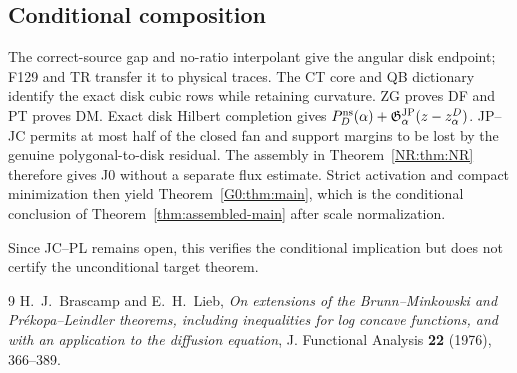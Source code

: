 \documentclass[11pt]{amsart}
\numberwithin{equation}{section}
\theoremstyle{definition}
\theoremstyle{remark}
\newcommand{\Gjp}{\mathfrak G^{\rm JP}}
\begin{document}
\subsection{Conditional composition}

The correct-source gap and no-ratio interpolant give the angular disk
endpoint; F129 and TR transfer it to physical traces.  The CT core and QB
dictionary identify the exact disk cubic rows while retaining curvature.
ZG proves DF and PT proves DM.  Exact disk Hilbert completion gives
$P_D^{\rm ns}(\alpha)+\Gjp_\alpha(z-z_\alpha^D)$.  JP--JC permits at most
half of the closed fan and support margins to be lost by the genuine
polygonal-to-disk residual.  The assembly in Theorem~\ref{NR:thm:NR}
therefore gives J0 without a separate flux estimate.  Strict activation
and compact minimization then yield Theorem~\ref{G0:thm:main}, which is the
conditional conclusion of Theorem~\ref{thm:assembled-main} after scale
normalization.

Since JC--PL remains open, this verifies the conditional implication but
does not certify the unconditional target theorem.

\begin{thebibliography}{9}
H.~J.~Brascamp and E.~H.~Lieb,
\emph{On extensions of the Brunn--Minkowski and Pr\'ekopa--Leindler
theorems, including inequalities for log concave functions, and with an
application to the diffusion equation},
J. Functional Analysis \textbf{22} (1976), 366--389.
\end{thebibliography}
\end{document}
